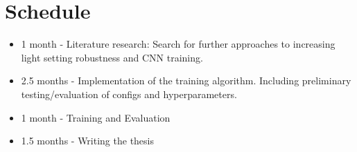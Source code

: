 \chapter{Schedule}
\label{cha:Schedule}


\begin{itemize}
    \item 1 month - Literature research: Search for further approaches to increasing light setting robustness and CNN training. 
    \item 2.5 months - Implementation of the training algorithm. Including preliminary testing/evaluation of configs and hyperparameters.
    \item 1 month - Training and Evaluation
    \item 1.5 months - Writing the thesis
\end{itemize}